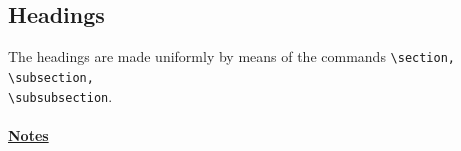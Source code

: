 \subsection{Headings}
The headings are made uniformly by means of the commands \verb!\section, \subsection,! \\ \verb!\subsubsection!.\\
\\
\textbf{\uline{Notes}}
